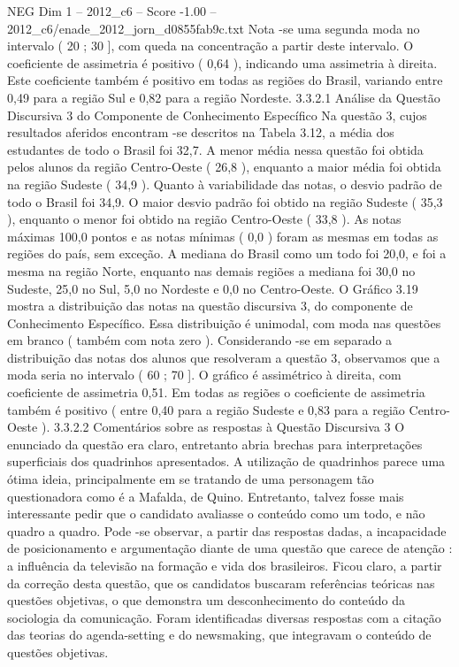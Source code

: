 \begin{textsample}{NEG Dim 1 – 2012\_c6 – Score -1.00 – 2012\_c6/enade\_2012\_jorn\_d0855fab9c.txt}
Nota -se uma segunda moda no intervalo ( 20 ; 30 ], com queda na concentração a partir deste intervalo.
O coeficiente de assimetria é positivo ( 0,64 ), indicando uma assimetria à direita.
Este coeficiente também é positivo em todas as regiões do Brasil, variando entre 0,49 para a região Sul e 0,82 para a região Nordeste. 3.3.2.1 Análise da Questão Discursiva 3 do Componente de Conhecimento Específico Na questão 3, cujos resultados aferidos encontram -se descritos na Tabela 3.12, a média dos estudantes de todo o Brasil foi 32,7.
A menor média nessa questão foi obtida pelos alunos da região Centro-Oeste ( 26,8 ), enquanto a maior média foi obtida na região Sudeste ( 34,9 ).
Quanto à variabilidade das notas, o desvio padrão de todo o Brasil foi 34,9.
O maior desvio padrão foi obtido na região Sudeste ( 35,3 ), enquanto o menor foi obtido na região Centro-Oeste ( 33,8 ).
As notas máximas 100,0 pontos e as notas mínimas ( 0,0 ) foram as mesmas em todas as regiões do país, sem exceção.
A mediana do Brasil como um todo foi 20,0, e foi a mesma na região Norte, enquanto nas demais regiões a mediana foi 30,0 no Sudeste, 25,0 no Sul, 5,0 no Nordeste e 0,0 no Centro-Oeste.
O Gráfico 3.19 mostra a distribuição das notas na questão discursiva 3, do componente de Conhecimento Específico.
Essa distribuição é unimodal, com moda nas questões em branco ( também com nota zero ).
Considerando -se em separado a distribuição das notas dos alunos que resolveram a questão 3, observamos que a moda seria no intervalo ( 60 ; 70 ].
O gráfico é assimétrico à direita, com coeficiente de assimetria 0,51.
Em todas as regiões o coeficiente de assimetria também é positivo ( entre 0,40 para a região Sudeste e 0,83 para a região Centro-Oeste ). 3.3.2.2 Comentários sobre as respostas à Questão Discursiva 3 O enunciado da questão era claro, entretanto abria brechas para interpretações superficiais dos quadrinhos apresentados.
A utilização de quadrinhos parece uma ótima ideia, principalmente em se tratando de uma personagem tão questionadora como é a Mafalda, de Quino.
Entretanto, talvez fosse mais interessante pedir que o candidato avaliasse o conteúdo como um todo, e não quadro a quadro.
Pode -se observar, a partir das respostas dadas, a incapacidade de posicionamento e argumentação diante de uma questão que carece de atenção : a influência da televisão na formação e vida dos brasileiros.
Ficou claro, a partir da correção desta questão, que os candidatos buscaram referências teóricas nas questões objetivas, o que demonstra um desconhecimento do conteúdo da sociologia da comunicação.
Foram identificadas diversas respostas com a citação das teorias do agenda-setting e do newsmaking, que integravam o conteúdo de questões objetivas.

\end{textsample}
